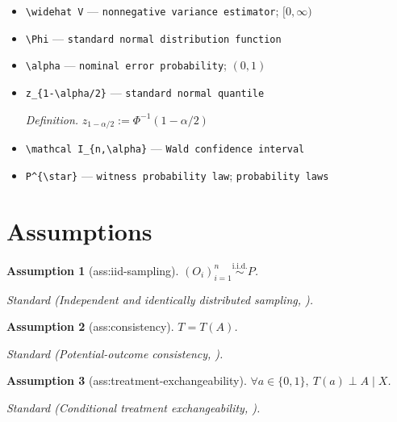 \documentclass{article}
\newtheorem{assumption}{Assumption}
\begin{document}
\begin{itemize}
  \item \texttt{\textbackslash{}\allowbreak{}widehat V} --- \texttt{nonnegative variance estimator}; \([0,\infty)\)
  \item \texttt{\textbackslash{}\allowbreak{}Phi} --- \texttt{standard normal distribution function}
  \item \texttt{\textbackslash{}\allowbreak{}alpha} --- \texttt{nominal error probability}; \((0,1)\)
  \item \texttt{z\_\allowbreak{}\{1-\allowbreak{}\textbackslash{}\allowbreak{}alpha/\allowbreak{}2\}\allowbreak{}} --- \texttt{standard normal quantile}
  \par\smallskip\noindent\emph{Definition.} \(z_{1-\alpha/2}:=\Phi^{-1}(1-\alpha/2)\)
  \item \texttt{\textbackslash{}\allowbreak{}mathcal I\_\allowbreak{}\{n,\allowbreak{}\textbackslash{}\allowbreak{}alpha\}\allowbreak{}} --- \texttt{Wald confidence interval}
  \item \texttt{P\textasciicircum{}\{\textbackslash{}\allowbreak{}star\}\allowbreak{}} --- \texttt{witness probability law}; \texttt{probability laws}
\end{itemize}

\section{Assumptions}

\begin{assumption}[ass:iid-sampling]\label{ass:iid-sampling}
\((O_i)_{i=1}^n\stackrel{\mathrm{i.i.d.}}{\sim}P\).
\par\smallskip\noindent\emph{Standard} (Independent and identically distributed sampling, \cite{chernozhukov2018dml}).
\end{assumption}

\begin{assumption}[ass:consistency]\label{ass:consistency}
\(T=T(A)\).
\par\smallskip\noindent\emph{Standard} (Potential-outcome consistency, \cite{westling2024inference}).
\end{assumption}

\begin{assumption}[ass:treatment-exchangeability]\label{ass:treatment-exchangeability}
\(\forall a\in\{0,1\},\ T(a)\perp A\mid X\).
\par\smallskip\noindent\emph{Standard} (Conditional treatment exchangeability, \cite{westling2024inference}).
\end{assumption}
\end{document}

